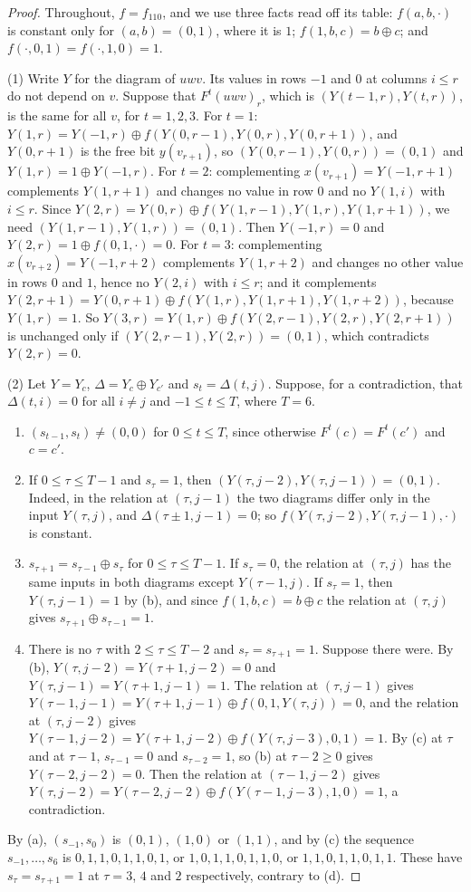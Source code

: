 \begin{proof}
Throughout, $f=f_{110}$, and we use three facts read off its table: $f(a,b,\cdot)$ is constant only for $(a,b)=(0,1)$, where it is $1$; $f(1,b,c)=b\oplus c$; and $f(\cdot,0,1)=f(\cdot,1,0)=1$.

(1) Write $Y$ for the diagram of $uwv$. Its values in rows $-1$ and $0$ at columns $i\le r$ do not depend on $v$. Suppose that $F^t(uwv)_r$, which is $(Y(t-1,r),Y(t,r))$, is the same for all $v$, for $t=1,2,3$. For $t=1$: $Y(1,r)=Y(-1,r)\oplus f(Y(0,r-1),Y(0,r),Y(0,r+1))$, and $Y(0,r+1)$ is the free bit $y(v_{r+1})$, so $(Y(0,r-1),Y(0,r))=(0,1)$ and $Y(1,r)=1\oplus Y(-1,r)$. For $t=2$: complementing $x(v_{r+1})=Y(-1,r+1)$ complements $Y(1,r+1)$ and changes no value in row $0$ and no $Y(1,i)$ with $i\le r$. Since $Y(2,r)=Y(0,r)\oplus f(Y(1,r-1),Y(1,r),Y(1,r+1))$, we need $(Y(1,r-1),Y(1,r))=(0,1)$. Then $Y(-1,r)=0$ and $Y(2,r)=1\oplus f(0,1,\cdot)=0$. For $t=3$: complementing $x(v_{r+2})=Y(-1,r+2)$ complements $Y(1,r+2)$ and changes no other value in rows $0$ and $1$, hence no $Y(2,i)$ with $i\le r$; and it complements $Y(2,r+1)=Y(0,r+1)\oplus f(Y(1,r),Y(1,r+1),Y(1,r+2))$, because $Y(1,r)=1$. So $Y(3,r)=Y(1,r)\oplus f(Y(2,r-1),Y(2,r),Y(2,r+1))$ is unchanged only if $(Y(2,r-1),Y(2,r))=(0,1)$, which contradicts $Y(2,r)=0$.

(2) Let $Y=Y_c$, $\Delta=Y_c\oplus Y_{c'}$ and $s_t=\Delta(t,j)$. Suppose, for a contradiction, that $\Delta(t,i)=0$ for all $i\ne j$ and $-1\le t\le T$, where $T=6$.
\begin{enumerate}
\item[(a)] $(s_{t-1},s_t)\ne(0,0)$ for $0\le t\le T$, since otherwise $F^t(c)=F^t(c')$ and $c=c'$.
\item[(b)] If $0\le\tau\le T-1$ and $s_\tau=1$, then $(Y(\tau,j-2),Y(\tau,j-1))=(0,1)$. Indeed, in the relation at $(\tau,j-1)$ the two diagrams differ only in the input $Y(\tau,j)$, and $\Delta(\tau\pm1,j-1)=0$; so $f(Y(\tau,j-2),Y(\tau,j-1),\cdot)$ is constant.
\item[(c)] $s_{\tau+1}=s_{\tau-1}\oplus s_\tau$ for $0\le\tau\le T-1$. If $s_\tau=0$, the relation at $(\tau,j)$ has the same inputs in both diagrams except $Y(\tau-1,j)$. If $s_\tau=1$, then $Y(\tau,j-1)=1$ by (b), and since $f(1,b,c)=b\oplus c$ the relation at $(\tau,j)$ gives $s_{\tau+1}\oplus s_{\tau-1}=1$.
\item[(d)] There is no $\tau$ with $2\le\tau\le T-2$ and $s_\tau=s_{\tau+1}=1$. Suppose there were. By (b), $Y(\tau,j-2)=Y(\tau+1,j-2)=0$ and $Y(\tau,j-1)=Y(\tau+1,j-1)=1$. The relation at $(\tau,j-1)$ gives $Y(\tau-1,j-1)=Y(\tau+1,j-1)\oplus f(0,1,Y(\tau,j))=0$, and the relation at $(\tau,j-2)$ gives $Y(\tau-1,j-2)=Y(\tau+1,j-2)\oplus f(Y(\tau,j-3),0,1)=1$. By (c) at $\tau$ and at $\tau-1$, $s_{\tau-1}=0$ and $s_{\tau-2}=1$, so (b) at $\tau-2\ge0$ gives $Y(\tau-2,j-2)=0$. Then the relation at $(\tau-1,j-2)$ gives $Y(\tau,j-2)=Y(\tau-2,j-2)\oplus f(Y(\tau-1,j-3),1,0)=1$, a contradiction.
\end{enumerate}
By (a), $(s_{-1},s_0)$ is $(0,1)$, $(1,0)$ or $(1,1)$, and by (c) the sequence $s_{-1},\dots,s_6$ is $0,1,1,0,1,1,0,1$, or $1,0,1,1,0,1,1,0$, or $1,1,0,1,1,0,1,1$. These have $s_\tau=s_{\tau+1}=1$ at $\tau=3$, $4$ and $2$ respectively, contrary to (d).


\end{proof}
